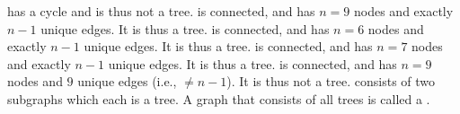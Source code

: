 \begin{itemize}
   has a cycle and is thus not a tree.
   is connected, and has $n=9$ nodes and exactly $n-1$ unique edges. It is thus a tree.
   is connected, and has $n=6$ nodes and exactly $n-1$ unique edges. It is thus a tree.
   is connected, and has $n=7$ nodes and exactly $n-1$ unique edges. It is thus a tree.
   is connected, and has $n=9$ nodes and $9$ unique edges (i.e., $\neq n-1$). It is thus not a tree.
   consists of two subgraphs which each is a tree. A graph that consists of all trees is called a .
\end{itemize}

